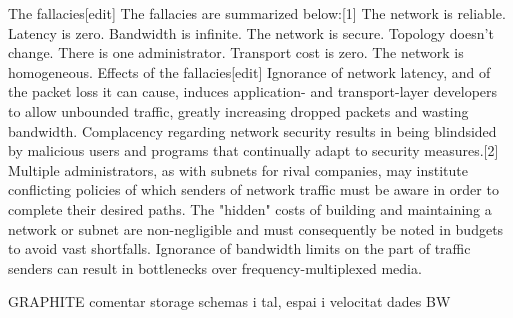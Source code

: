The fallacies[edit]
The fallacies are summarized below:[1]
The network is reliable.
Latency is zero.
Bandwidth is infinite.
The network is secure.
Topology doesn't change.
There is one administrator.
Transport cost is zero.
The network is homogeneous.
Effects of the fallacies[edit]
Ignorance of network latency, and of the packet loss it can cause, induces application- and transport-layer developers to allow unbounded traffic, greatly increasing dropped packets and wasting bandwidth.
Complacency regarding network security results in being blindsided by malicious users and programs that continually adapt to security measures.[2]
Multiple administrators, as with subnets for rival companies, may institute conflicting policies of which senders of network traffic must be aware in order to complete their desired paths.
The "hidden" costs of building and maintaining a network or subnet are non-negligible and must consequently be noted in budgets to avoid vast shortfalls.
Ignorance of bandwidth limits on the part of traffic senders can result in bottlenecks over frequency-multiplexed media.


GRAPHITE
comentar storage schemas i tal, espai i velocitat dades BW